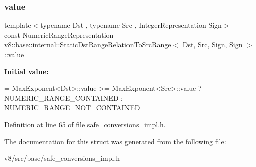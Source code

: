 \subsubsection{\texorpdfstring{value}{value}}
{\footnotesize\ttfamily template$<$typename Dst , typename Src , Integer\+Representation Sign$>$ \\
const Numeric\+Range\+Representation \mbox{\hyperlink{structv8_1_1base_1_1internal_1_1StaticDstRangeRelationToSrcRange}{v8\+::base\+::internal\+::\+Static\+Dst\+Range\+Relation\+To\+Src\+Range}}$<$ Dst, Src, Sign, Sign $>$\+::value\hspace{0.3cm}{\ttfamily [static]}}

{\bfseries Initial value\+:}
\begin{DoxyCode}
=
      MaxExponent<Dst>::value >= MaxExponent<Src>::value
          ? NUMERIC\_RANGE\_CONTAINED
          : NUMERIC\_RANGE\_NOT\_CONTAINED
\end{DoxyCode}


Definition at line 65 of file safe\+\_\+conversions\+\_\+impl.\+h.



The documentation for this struct was generated from the following file\+:\begin{DoxyCompactItemize}
\item 
v8/src/base/safe\+\_\+conversions\+\_\+impl.\+h\end{DoxyCompactItemize}

